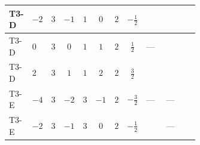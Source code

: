 \documentclass[8pt]{article}
\begin{document}
\begin{landscape}
\begin{longtable}{@{}llcccccc >{\raggedright\arraybackslash}p{0.21\linewidth} >{\raggedright\arraybackslash}p{0.21\linewidth} >{\raggedright\arraybackslash}p{0.21\linewidth}@{}}
\midrule
T3-D & $-2$ & $3$ & $-1$ & $1$ & $0$ & $2$ & $-\frac{1}{2}$ & \scriptsize\adjustbox{max width=\linewidth}{$\begin{gathered} +\frac{3 {g_1}^4}{2}\end{gathered}$} & \scriptsize\adjustbox{max width=\linewidth}{$\begin{gathered} +\frac{{\lambda_{12}^{(1)}}^2}{4}\end{gathered}$} & \scriptsize\adjustbox{max width=\linewidth}{$\begin{gathered} +\frac{{\lambda_{HS_1}^{(1)}}^2}{2}\end{gathered}$} \\
\midrule
T3-D & $0$ & $3$ & $0$ & $1$ & $1$ & $2$ & $\frac{1}{2}$ & --- & \scriptsize\adjustbox{max width=\linewidth}{$\begin{gathered} +\frac{{\lambda_{12}^{(1)}}^2}{4}\end{gathered}$} & \scriptsize\adjustbox{max width=\linewidth}{$\begin{gathered} +\frac{{\lambda_{HS_1}^{(1)}}^2}{2}\end{gathered}$} \\
\midrule
T3-D & $2$ & $3$ & $1$ & $1$ & $2$ & $2$ & $\frac{3}{2}$ & \scriptsize\adjustbox{max width=\linewidth}{$\begin{gathered} +\frac{3 {g_1}^4}{2}\end{gathered}$} & \scriptsize\adjustbox{max width=\linewidth}{$\begin{gathered} +\frac{{\lambda_{12}^{(1)}}^2}{4}\end{gathered}$} & \scriptsize\adjustbox{max width=\linewidth}{$\begin{gathered} +\frac{{\lambda_{HS_1}^{(1)}}^2}{2}\end{gathered}$} \\
\midrule
T3-E & $-4$ & $3$ & $-2$ & $3$ & $-1$ & $2$ & $-\frac{3}{2}$ & --- & --- & \scriptsize\adjustbox{max width=\linewidth}{$\begin{gathered} +\frac{{\lambda_{HS_1}^{(1)}}^2}{2}\end{gathered}$} \\
\midrule
T3-E & $-2$ & $3$ & $-1$ & $3$ & $0$ & $2$ & $-\frac{1}{2}$ & \scriptsize\adjustbox{max width=\linewidth}{$\begin{gathered} +\frac{3 {g_1}^4}{2}\end{gathered}$} & --- & \scriptsize\adjustbox{max width=\linewidth}{$\begin{gathered} +\frac{{\lambda_{HS_1}^{(1)}}^2}{2}\end{gathered}$} \\

\end{longtable}
\end{landscape}
\end{document}
